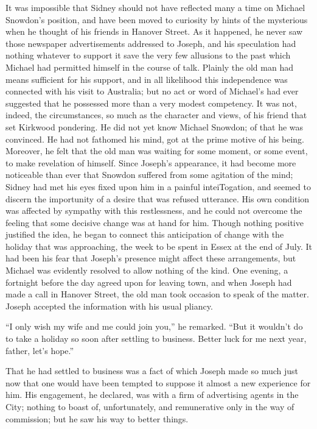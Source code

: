 It was impossible that Sidney should not have reflected many a time on
Michael Snowdon's position, and have been moved to curiosity by hints of
the mysterious when he thought of his friends in Hanover Street. As it
happened, he never saw those newspaper advertisements addressed to
Joseph, and his speculation had nothing whatever to support it save the
very few allusions to the past which Michael had permitted himself in
the course of talk. Plainly the old man had means sufficient for his
support, and in all likelihood this independence was connected with his
visit to Australia; but no act or word of Michael's had ever suggested
that he possessed more than a very modest competency. It was not,
indeed, the circumstances, so much as the character and views, of his
friend that set Kirkwood pondering. He did not yet know Michael Snowdon;
of that he was {}convinced. He had not fathomed his mind, got at the
prime motive of his being. Moreover, he felt that the old man was
waiting for some moment, or some event, to make revelation of himself.
Since Joseph's appearance, it had become more noticeable than ever that
Snowdon suffered from some agitation of the mind; Sidney had met his
eyes fixed upon him in a painful inteiTogation, and seemed to discern
the importunity of a desire that was refused utterance. His own
condition was affected by sympathy with this restlessness, and he could
not overcome the feeling that some decisive change was at hand for him.
Though nothing positive justified the idea, he began to connect this
anticipation of change with the holiday that was approaching, the week
to be spent in Essex at the end of July. It had been his fear that
Joseph's presence might affect these arrangements, but Michael was
evidently resolved to allow nothing of the kind. One evening, a
fortnight before the day agreed upon for leaving town, and when Joseph
had made a call in {}Hanover Street, the old man took occasion to speak
of the matter. Joseph accepted the information with his usual pliancy.

``I only wish my wife and me could join you,'' he remarked. ``But it
wouldn't do to take a holiday so soon after settling to business. Better
luck for me next year, father, let's hope.''

That he had settled to business was a fact of which Joseph made so much
just now that one would have been tempted to suppose it almost a new
experience for him. His engagement, he declared, was with a firm of
advertising agents in the City; nothing to boast of, unfortunately, and
remunerative only in the way of commission; but he saw his way to better
things.

